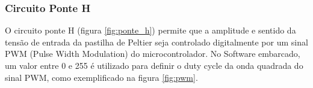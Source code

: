 

\subsubsection*{Circuito Ponte H}

O circuito ponte H (figura \ref{fig:ponte_h}) permite que a amplitude e sentido da tensão de entrada da pastilha de Peltier seja controlado digitalmente por um sinal PWM (Pulse Width Modulation) do microcontrolador. No Software embarcado, um valor entre 0 e 255 é utilizado para definir o duty cycle da onda quadrada do sinal PWM, como exemplificado na figura \ref{fig:pwm}. 


